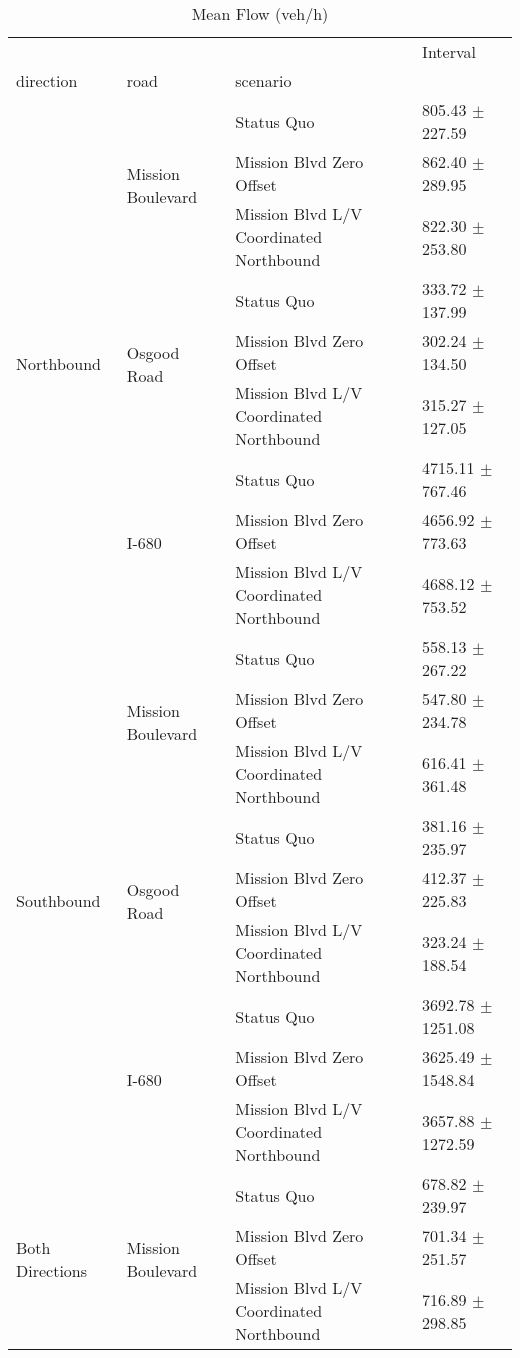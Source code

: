 \begin{table}
\caption{Mean Flow (veh/h)}
\begin{tabular}{llll}
\toprule
 &  &  & Interval \\
direction & road & scenario &  \\
\midrule
\multirow[t]{9}{*}{Northbound} & \multirow[t]{3}{*}{Mission Boulevard} & Status Quo & 805.43 $\pm$ 227.59 \\
 &  & Mission Blvd Zero Offset & 862.40 $\pm$ 289.95 \\
 &  & Mission Blvd L/V Coordinated Northbound & 822.30 $\pm$ 253.80 \\
 & \multirow[t]{3}{*}{Osgood Road} & Status Quo & 333.72 $\pm$ 137.99 \\
 &  & Mission Blvd Zero Offset & 302.24 $\pm$ 134.50 \\
 &  & Mission Blvd L/V Coordinated Northbound & 315.27 $\pm$ 127.05 \\
 & \multirow[t]{3}{*}{I-680} & Status Quo & 4715.11 $\pm$ 767.46 \\
 &  & Mission Blvd Zero Offset & 4656.92 $\pm$ 773.63 \\
 &  & Mission Blvd L/V Coordinated Northbound & 4688.12 $\pm$ 753.52 \\
\multirow[t]{9}{*}{Southbound} & \multirow[t]{3}{*}{Mission Boulevard} & Status Quo & 558.13 $\pm$ 267.22 \\
 &  & Mission Blvd Zero Offset & 547.80 $\pm$ 234.78 \\
 &  & Mission Blvd L/V Coordinated Northbound & 616.41 $\pm$ 361.48 \\
 & \multirow[t]{3}{*}{Osgood Road} & Status Quo & 381.16 $\pm$ 235.97 \\
 &  & Mission Blvd Zero Offset & 412.37 $\pm$ 225.83 \\
 &  & Mission Blvd L/V Coordinated Northbound & 323.24 $\pm$ 188.54 \\
 & \multirow[t]{3}{*}{I-680} & Status Quo & 3692.78 $\pm$ 1251.08 \\
 &  & Mission Blvd Zero Offset & 3625.49 $\pm$ 1548.84 \\
 &  & Mission Blvd L/V Coordinated Northbound & 3657.88 $\pm$ 1272.59 \\
\multirow[t]{9}{*}{Both Directions} & \multirow[t]{3}{*}{Mission Boulevard} & Status Quo & 678.82 $\pm$ 239.97 \\
 &  & Mission Blvd Zero Offset & 701.34 $\pm$ 251.57 \\
 &  & Mission Blvd L/V Coordinated Northbound & 716.89 $\pm$ 298.85 \\

\end{tabular}
\end{table}
